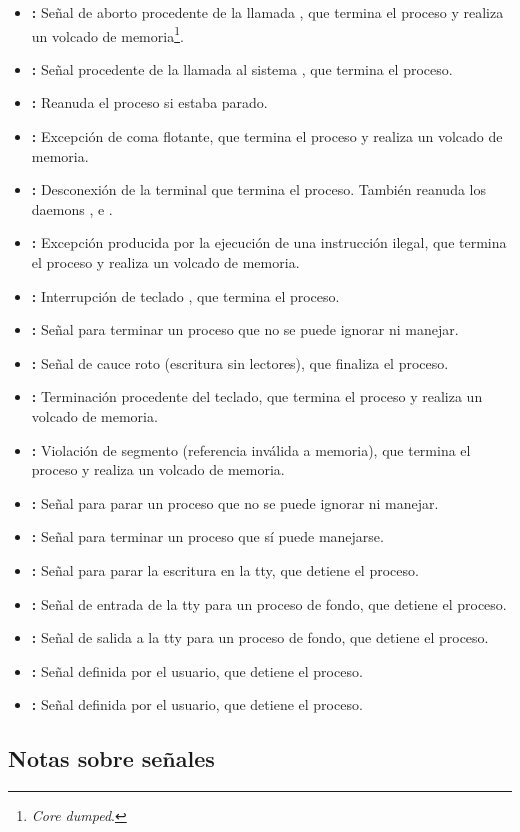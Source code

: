 \begin{itemize}
\item{}\textbf{:} Señal de aborto procedente de la llamada , que termina el proceso y realiza un volcado de memoria\footnote{\emph{Core dumped}.}.
\item{}\textbf{:} Señal procedente de la llamada al sistema , que termina el proceso.
\item{}\textbf{:} Reanuda el proceso si estaba parado.
\item{}\textbf{:} Excepción de coma flotante, que termina el proceso y realiza un volcado de memoria.
\item{}\textbf{:} Desconexión de la terminal que termina el proceso. También reanuda los daemons ,  e .
\item{}\textbf{:} Excepción producida por la ejecución de una instrucción ilegal, que termina el proceso y realiza un volcado de memoria.
\item{}\textbf{:} Interrupción de teclado , que termina el proceso.
\item{}\textbf{:} Señal para terminar un proceso que no se puede ignorar ni manejar.
\item{}\textbf{:} Señal de cauce roto (escritura sin lectores), que finaliza el proceso.
\item{}\textbf{:} Terminación procedente del teclado, que termina el proceso y realiza un volcado de memoria.
\item{}\textbf{:} Violación de segmento (referencia inválida a memoria), que termina el proceso y realiza un volcado de memoria.
\item{}\textbf{:} Señal para parar un proceso que no se puede ignorar ni manejar.
\item{}\textbf{:} Señal para terminar un proceso que sí puede manejarse.
\item{}\textbf{:} Señal para parar la escritura en la tty, que detiene el proceso.
\item{}\textbf{:} Señal de entrada de la tty para un proceso de fondo, que detiene el proceso.
\item{}\textbf{:} Señal de salida a la tty para un proceso de fondo, que detiene el proceso.
\item{}\textbf{:} Señal definida por el usuario, que detiene el proceso.
\item{}\textbf{:} Señal definida por el usuario, que detiene el proceso.
\end{itemize}

\subsection{Notas sobre señales}
